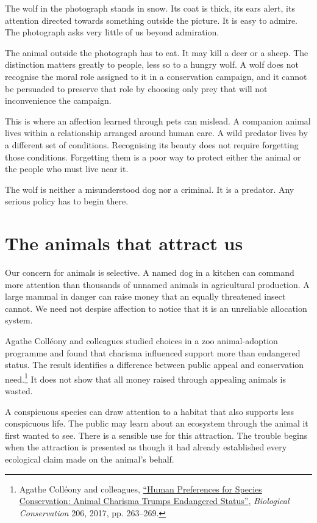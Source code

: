 \documentclass[12pt,a4paper]{book}
\begin{document}
The wolf in the photograph stands in snow. Its coat is thick, its ears alert, its attention directed towards something outside the picture. It is easy to admire. The photograph asks very little of us beyond admiration.

The animal outside the photograph has to eat. It may kill a deer or a sheep. The distinction matters greatly to people, less so to a hungry wolf. A wolf does not recognise the moral role assigned to it in a conservation campaign, and it cannot be persuaded to preserve that role by choosing only prey that will not inconvenience the campaign.

This is where an affection learned through pets can mislead. A companion animal lives within a relationship arranged around human care. A wild predator lives by a different set of conditions. Recognising its beauty does not require forgetting those conditions. Forgetting them is a poor way to protect either the animal or the people who must live near it.

The wolf is neither a misunderstood dog nor a criminal. It is a predator. Any serious policy has to begin there.

\section*{The animals that attract us}

Our concern for animals is selective. A named dog in a kitchen can command more attention than thousands of unnamed animals in agricultural production. A large mammal in danger can raise money that an equally threatened insect cannot. We need not despise affection to notice that it is an unreliable allocation system.

Agathe Colléony and colleagues studied choices in a zoo animal-adoption programme and found that charisma influenced support more than endangered status. The result identifies a difference between public appeal and conservation need.\footnote{Agathe Colléony and colleagues, \href{https://cris.technion.ac.il/en/publications/human-preferences-for-species-conservation-animal-charisma-trumps/}{``Human Preferences for Species Conservation: Animal Charisma Trumps Endangered Status''}, \emph{Biological Conservation} 206, 2017, pp. 263--269.} It does not show that all money raised through appealing animals is wasted.

A conspicuous species can draw attention to a habitat that also supports less conspicuous life. The public may learn about an ecosystem through the animal it first wanted to see. There is a sensible use for this attraction. The trouble begins when the attraction is presented as though it had already established every ecological claim made on the animal's behalf.
\end{document}
